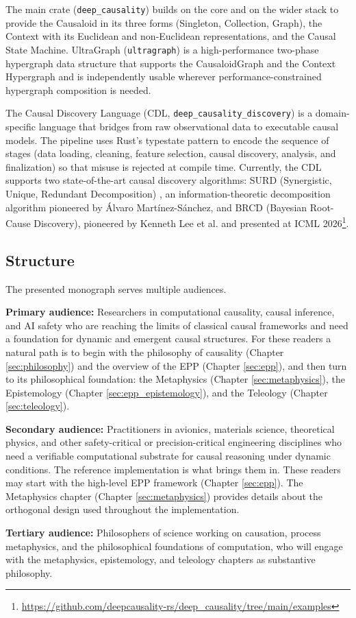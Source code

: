 The main crate (\texttt{deep\_causality}) builds on the core and on the wider stack to provide the Causaloid in its three forms (Singleton, Collection, Graph), the Context with its Euclidean and non-Euclidean representations, and the Causal State Machine. UltraGraph (\texttt{ultragraph}) is a high-performance two-phase hypergraph data structure that supports the CausaloidGraph and the Context Hypergraph and is independently usable wherever performance-constrained hypergraph composition is needed.

The Causal Discovery Language (CDL, \texttt{deep\_causality\_discovery}) is a domain-specific language that bridges from raw observational data to executable causal models. The pipeline uses Rust's typestate pattern to encode the sequence of stages (data loading, cleaning, feature selection, causal discovery, analysis, and finalization) so that misuse is rejected at compile time. Currently, the CDL supports two state-of-the-art causal discovery algorithms: SURD (Synergistic, Unique, Redundant Decomposition) \cite{martinez2025observational}, an information-theoretic decomposition algorithm pioneered by Álvaro Martínez-Sánchez, and BRCD (Bayesian Root-Cause Discovery), pioneered by Kenneth Lee et al. \cite{TODO-Lee-2026} and presented at ICML 2026\footnote{\url{https://github.com/deepcausality-rs/deep_causality/tree/main/examples}}.


\subsection{Structure}

The presented monograph serves multiple audiences.

\textbf{Primary audience:} Researchers in computational causality, causal inference, and AI safety who are reaching the limits of classical causal frameworks and need a foundation for dynamic and emergent causal structures. For these readers a natural path is to begin with the philosophy of causality (Chapter \ref{sec:philosophy}) and the overview of the EPP (Chapter \ref{sec:epp}), and then turn to its philosophical foundation: the Metaphysics (Chapter \ref{sec:metaphysics}), the Epistemology (Chapter \ref{sec:epp_epistemology}), and the Teleology (Chapter \ref{sec:teleology}).

\textbf{Secondary audience:} Practitioners in avionics, materials science, theoretical physics, and other safety-critical or precision-critical engineering disciplines who need a verifiable computational substrate for causal reasoning under dynamic conditions. The reference implementation is what brings them in. These readers may start with the high-level EPP framework (Chapter \ref{sec:epp}). The Metaphysics chapter (Chapter \ref{sec:metaphysics}) provides details about the orthogonal design used throughout the implementation.


\textbf{Tertiary audience:} Philosophers of science working on causation, process metaphysics, and the philosophical foundations of computation, who will engage with the metaphysics, epistemology, and teleology chapters as substantive philosophy.


\newpage